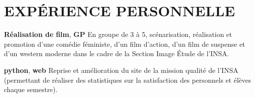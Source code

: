 \documentclass[11pt,a4paper]{moderncv}
\begin{document}






  \section{EXPÉRIENCE PERSONNELLE}

  \cvline
    {\textbf{Réalisation de film}, \textbf{GP}}
    {
      En groupe de 3 à 5, scénarisation, réalisation et promotion d'une comédie
      féministe, d'un film d'action, d'un film de suspense et d'un western
      moderne dans le cadre de la Section Image Étude de l'INSA.
    }{}{}

  \cvline
    {\textbf{python}, \textbf{web}}
    {
      Reprise et amélioration du site de la mission qualité de l'INSA
      (permettant de réaliser des statistiques sur la satisfaction des
      personnels et élèves chaque semestre).
    }{}{}
\end{document}
